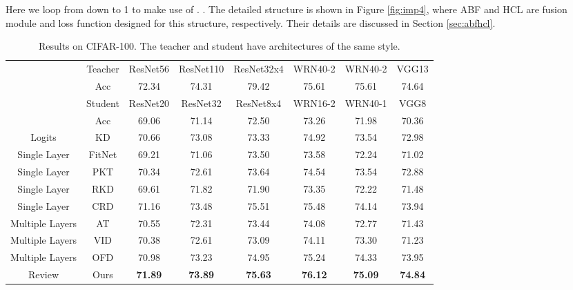 \documentclass[final]{cvpr}
\begin{document}
Here we loop from  down to 1 to make use of . . The detailed structure is shown in Figure \ref{fig:imp4}, where ABF and HCL are fusion module and loss function designed for this structure, respectively. Their details are discussed in Section \ref{sec:abfhcl}.

\begin{table*}[t]
	\centering

	\begin{tabular}{c @{\hspace{0.3in}} c @{\hspace{0.25in}} c  c  c  c  c  c }
		\toprule
		 & Teacher & ResNet56 & ResNet110 & ResNet32x4 & WRN40-2 & WRN40-2 & VGG13  \\
		& Acc     & 72.34    & 74.31     & 79.42      & 75.61   & 75.61   & 74.64  \\ 
		& Student & ResNet20 & ResNet32  & ResNet8x4  & WRN16-2 & WRN40-1 & VGG8   \\
		& Acc     & 69.06    & 71.14     & 72.50      & 73.26   & 71.98   & 70.36  \\
		\midrule
		Logits & KD \cite{kd}      & 70.66    & 73.08     & 73.33      & 74.92   & 73.54   & 72.98  \\
		\midrule
		Single Layer & FitNet \cite{fitnet}  & 69.21    & 71.06     & 73.50      & 73.58   & 72.24   & 71.02  \\
		Single Layer & PKT \cite{pkt}     & 70.34    & 72.61     & 73.64      & 74.54   & 73.54   & 72.88  \\
		Single Layer & RKD \cite{rkd}     & 69.61    & 71.82     & 71.90      & 73.35   & 72.22   & 71.48  \\
		Single Layer & CRD \cite{crd}     & 71.16    & 73.48     & 75.51      & 75.48   & 74.14   & 73.94  \\
		\midrule
		Multiple Layers & AT \cite{at}      & 70.55    & 72.31     & 73.44      & 74.08   & 72.77   & 71.43  \\
		Multiple Layers & VID \cite{vid}      & 70.38    & 72.61     & 73.09      & 74.11   & 73.30   & 71.23  \\
		Multiple Layers & OFD \cite{ofd}     & 70.98    & 73.23     & 74.95      & 75.24   & 74.33   & 73.95  \\
		\midrule
		\midrule
		Review & Ours&\textbf{71.89}&\textbf{73.89}&\textbf{75.63}&\textbf{76.12}&\textbf{75.09}&\textbf{74.84}\\
		\bottomrule
	\end{tabular}
	\vspace{0.1in}
	\caption{Results on CIFAR-100. The teacher and student have architectures of the same style.}
	\label{tab:c100s}
\end{table*}
\end{document}
